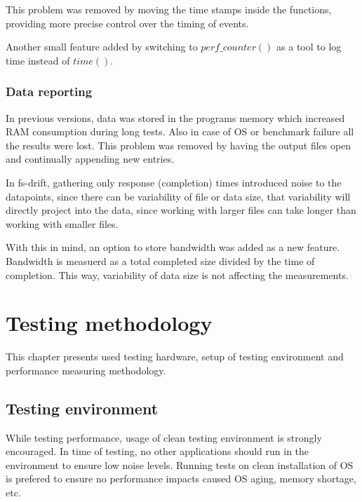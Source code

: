 \documentclass[
  color, %
  table, %
  lof,   %
  lot,   %
]{fithesis3}
\begin{document}
This problem was removed by moving the time stamps inside the functions, providing more precise control over the timing of events.

Another small feature added by switching to $perf\_counter()$ as a tool to log time instead of $time()$.


\subsection{Data reporting}
In previous versions, data was stored in the programs memory which increased RAM consumption during long tests. Also in case of OS or benchmark failure all the results were lost. This problem was removed by having the output files open and continually appending new entries.

In fs-drift, gathering only response (completion) times introduced noise to the datapoints, since there can be variability of file or data size, that variability will directly project into the data, since working with larger files can take longer than working with smaller files.

With this in mind, an option to store bandwidth was added as a new feature. Bandwidth is measuerd as a total completed size divided by the time of completion. This way, variability of data size is not affecting the measurements.




\chapter{Testing methodology}
This chapter presents used testing hardware, setup of testing environment and performance measuring methodology.


\section{Testing environment}
While testing performance, usage of clean testing environment is strongly encouraged. In time of testing, no other applications should run in the environment to ensure low noise levels. Running tests on clean installation of OS is prefered to ensure no performance impacts caused OS aging, memory shortage, etc.
\end{document}
